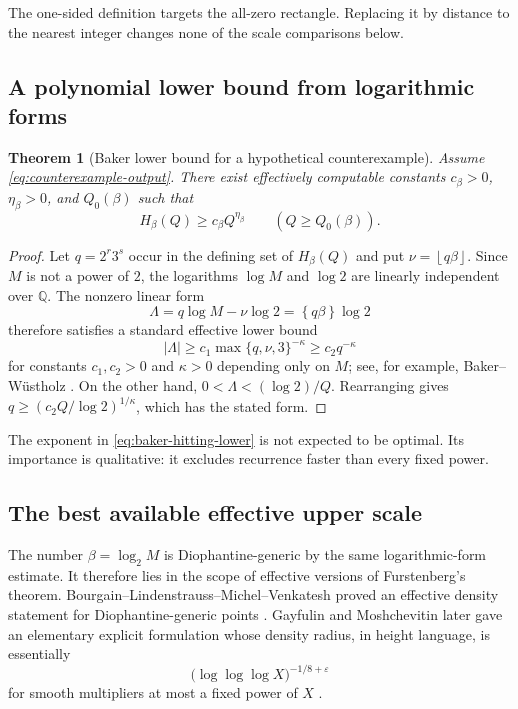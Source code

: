 \documentclass[11pt]{article}
\newtheorem{theorem}{Theorem}[section]
\theoremstyle{definition}
\theoremstyle{remark}
\newcommand{\Q}{\mathbb Q}
\newcommand{\fract}[1]{\left\{#1\right\}}
\newcommand{\floor}[1]{\left\lfloor#1\right\rfloor}
\begin{document}
The one-sided definition targets the all-zero rectangle.  Replacing it by distance
to the nearest integer changes none of the scale comparisons below.

\subsection{A polynomial lower bound from logarithmic forms}

\begin{theorem}[Baker lower bound for a hypothetical counterexample]
\label{thm:baker-hitting-lower}
Assume \eqref{eq:counterexample-output}.  There exist effectively computable
constants $c_\beta>0$, $\eta_\beta>0$, and $Q_0(\beta)$ such that
\begin{equation}\label{eq:baker-hitting-lower}
 H_\beta(Q)\ge c_\beta Q^{\eta_\beta}
 \qquad(Q\ge Q_0(\beta)).
\end{equation}
\end{theorem}

\begin{proof}
Let $q=2^r3^s$ occur in the defining set of $H_\beta(Q)$ and put
$\nu=\floor{q\beta}$.  Since $M$ is not a power of $2$, the logarithms
$\log M$ and $\log2$ are linearly independent over $\Q$.  The nonzero linear form
\begin{equation}\label{eq:linear-form-hitting}
 \Lambda=q\log M-\nu\log2=\fract{q\beta}\log2
\end{equation}
therefore satisfies a standard effective lower bound
\begin{equation}\label{eq:linear-form-polynomial}
 |\Lambda|\ge c_1\max\{q,\nu,3\}^{-\kappa}
 \ge c_2q^{-\kappa}
\end{equation}
for constants $c_1,c_2>0$ and $\kappa>0$ depending only on $M$; see, for example,
Baker--W\"ustholz \cite{BakerWustholz1993}.  On the other hand,
$0<\Lambda<(\log2)/Q$.  Rearranging gives
$q\ge(c_2Q/\log2)^{1/\kappa}$, which has the stated form.
\end{proof}

The exponent in \eqref{eq:baker-hitting-lower} is not expected to be optimal.  Its
importance is qualitative: it excludes recurrence faster than every fixed power.

\subsection{The best available effective upper scale}

The number $\beta=\log_2 M$ is Diophantine-generic by the same logarithmic-form
estimate.  It therefore lies in the scope of effective versions of Furstenberg's
theorem.  Bourgain--Lindenstrauss--Michel--Venkatesh proved an effective density
statement for Diophantine-generic points \cite{BLMV2009}.  Gayfulin and Moshchevitin
later gave an elementary explicit formulation whose density radius, in height
language, is essentially
\begin{equation}\label{eq:gm-density-radius}
 \bigl(\log\log\log X\bigr)^{-1/8+\varepsilon}
\end{equation}
for smooth multipliers at most a fixed power of $X$
\cite{GayfulinMoshchevitin2023}.
\end{document}
